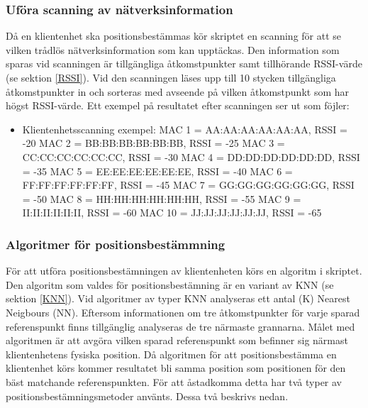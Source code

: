 \documentclass[a4paper,12pt]{article}
\begin{document}
 \subsubsection{Uföra scanning av nätverksinformation} \label{scanning}
 Då en klientenhet ska positionsbestämmas kör skriptet en scanning för att se vilken trådlös nätverksinformation som kan upptäckas. Den information som sparas vid scanningen är tillgängliga åtkomstpunkter samt tillhörande RSSI-värde (se sektion \ref{RSSI}). Vid den scanningen läses upp till 10 stycken tillgängliga åtkomstpunkter in och sorteras med avseende på vilken åtkomstpunkt som har högst RSSI-värde. Ett exempel på resultatet efter scanningen ser ut som föjler:

   \begin{itemize}
   \item Klientenhetsscanning exempel:
         \newline MAC 1 = AA:AA:AA:AA:AA:AA,  RSSI = -20
         \newline MAC 2 = BB:BB:BB:BB:BB:BB,  RSSI = -25
         \newline MAC 3 = CC:CC:CC:CC:CC:CC,  RSSI = -30
         \newline MAC 4 = DD:DD:DD:DD:DD:DD,  RSSI = -35
         \newline MAC 5 = EE:EE:EE:EE:EE:EE,  RSSI = -40
         \newline MAC 6 = FF:FF:FF:FF:FF:FF,  RSSI = -45
         \newline MAC 7 = GG:GG:GG:GG:GG:GG,  RSSI = -50
         \newline MAC 8 = HH:HH:HH:HH:HH:HH,  RSSI = -55
         \newline MAC 9 = II:II:II:II:II:II,  RSSI = -60
         \newline MAC 10 = JJ:JJ:JJ:JJ:JJ:JJ,  RSSI = -65
   \end{itemize}

 \subsubsection{Algoritmer för positionsbestämmning}\label{algoritm}
 För att utföra positionsbestämningen av klientenheten körs en algoritm i skriptet. Den algoritm som valdes för positionsbestämning är en variant av KNN (se sektion \ref{KNN}). Vid algoritmer av typer KNN analyseras ett antal (K) Nearest Neigbours (NN). Eftersom informationen om tre åtkomstpunkter för varje sparad referenspunkt finns tillgänglig analyseras de tre närmaste grannarna.
 Målet med algoritmen är att avgöra vilken sparad referenspunkt som befinner sig närmast klientenhetens fysiska position. Då algoritmen för att positionsbestämma en klientenhet körs kommer resultatet bli samma position som positionen för den bäst matchande referenspunkten. För att åstadkomma detta har två typer av positionsbestämningsmetoder använts. Dessa två beskrivs nedan.
\end{document}
